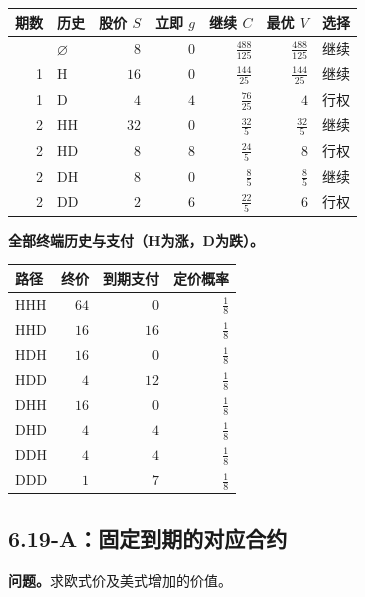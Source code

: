 \documentclass[11pt,a4paper,UTF8,fontset=fandol]{ctexart}
\begin{document}
\begin{longtable}[]{@{}rlrrrrl@{}}
\toprule\noalign{}
期数 & 历史 & 股价 \(S\) & 立即 \(g\) & 继续 \(C\) & 最优 \(V\) &
选择 \\
\midrule\noalign{}
\endhead
\bottomrule\noalign{}
\endlastfoot
0 & \(\varnothing\) & \(8\) & \(0\) & \(\frac{488}{125}\) &
\(\frac{488}{125}\) & 继续 \\
1 & H & \(16\) & \(0\) & \(\frac{144}{25}\) & \(\frac{144}{25}\) &
继续 \\
1 & D & \(4\) & \(4\) & \(\frac{76}{25}\) & \(4\) & 行权 \\
2 & HH & \(32\) & \(0\) & \(\frac{32}{5}\) & \(\frac{32}{5}\) & 继续 \\
2 & HD & \(8\) & \(8\) & \(\frac{24}{5}\) & \(8\) & 行权 \\
2 & DH & \(8\) & \(0\) & \(\frac{8}{5}\) & \(\frac{8}{5}\) & 继续 \\
2 & DD & \(2\) & \(6\) & \(\frac{22}{5}\) & \(6\) & 行权 \\
\end{longtable}

\textbf{全部终端历史与支付（H为涨，D为跌）。}

\begin{longtable}[]{@{}lrrr@{}}
\toprule\noalign{}
路径 & 终价 & 到期支付 & 定价概率 \\
\midrule\noalign{}
\endhead
\bottomrule\noalign{}
\endlastfoot
HHH & \(64\) & \(0\) & \(\frac{1}{8}\) \\
HHD & \(16\) & \(16\) & \(\frac{1}{8}\) \\
HDH & \(16\) & \(0\) & \(\frac{1}{8}\) \\
HDD & \(4\) & \(12\) & \(\frac{1}{8}\) \\
DHH & \(16\) & \(0\) & \(\frac{1}{8}\) \\
DHD & \(4\) & \(4\) & \(\frac{1}{8}\) \\
DDH & \(4\) & \(4\) & \(\frac{1}{8}\) \\
DDD & \(1\) & \(7\) & \(\frac{1}{8}\) \\
\end{longtable}

\endgroup

\subsection{6.19-A：固定到期的对应合约}\label{aux56faux5b9aux5230ux671fux7684ux5bf9ux5e94ux5408ux7ea6}

\textbf{问题。}求欧式价及美式增加的价值。
\end{document}
